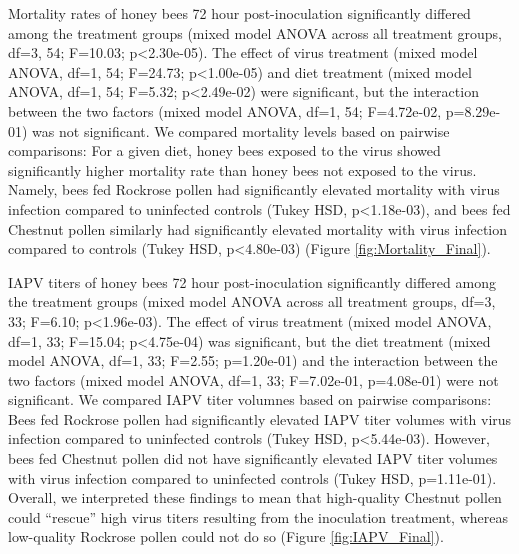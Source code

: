 \documentclass[11pt,a4paper,oldfontcommands,openany]{memoir}
\numberwithin{equation}{section} %
\begin{document}
Mortality rates of honey bees 72 hour post-inoculation significantly differed among the treatment groups (mixed model ANOVA across all treatment groups, df=3, 54; F=10.03; p<2.30e-05). The effect of virus treatment (mixed model ANOVA, df=1, 54; F=24.73; p<1.00e-05) and diet treatment (mixed model ANOVA, df=1, 54; F=5.32; p<2.49e-02) were significant, but the interaction between the two factors (mixed model ANOVA, df=1, 54; F=4.72e-02, p=8.29e-01) was not significant. We compared mortality levels based on pairwise comparisons: For a given diet, honey bees exposed to the virus showed significantly higher mortality rate than honey bees not exposed to the virus. Namely, bees fed Rockrose pollen had significantly elevated mortality with virus infection compared to uninfected controls (Tukey HSD, p<1.18e-03), and bees fed Chestnut pollen similarly had significantly elevated mortality with virus infection compared to controls (Tukey HSD, p<4.80e-03) (Figure \ref{fig:Mortality_Final}).

IAPV titers of honey bees 72 hour post-inoculation significantly differed among the treatment groups (mixed model ANOVA across all treatment groups, df=3, 33; F=6.10; p<1.96e-03). The effect of virus treatment (mixed model ANOVA, df=1, 33; F=15.04; p<4.75e-04) was significant, but the diet treatment (mixed model ANOVA, df=1, 33; F=2.55; p=1.20e-01) and the interaction between the two factors (mixed model ANOVA, df=1, 33; F=7.02e-01, p=4.08e-01) were not significant. We compared IAPV titer volumnes  based on pairwise comparisons: Bees fed Rockrose pollen had significantly elevated IAPV titer volumes with virus infection compared to uninfected controls (Tukey HSD, p<5.44e-03). However, bees fed Chestnut pollen did not have significantly elevated IAPV titer volumes with virus infection compared to uninfected controls (Tukey HSD, p=1.11e-01). Overall, we interpreted these findings to mean that high-quality Chestnut pollen could ``rescue'' high virus titers resulting from the inoculation treatment, whereas low-quality Rockrose pollen could not do so (Figure \ref{fig:IAPV_Final}).
\end{document}
